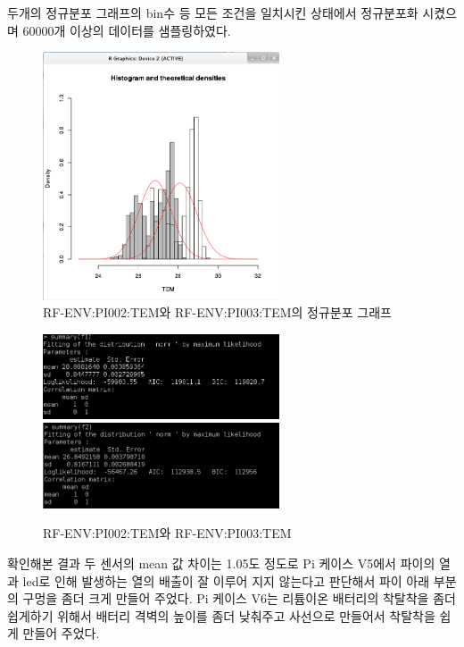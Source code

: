 \documentclass[11pt
  , a4paper
  , article
  , oneside
]{memoir}
\begin{document}
두개의 정규분포 그래프의 bin수 등 모든 조건을 일치시킨 상태에서 정규분포화 시켰으며 60000개 이상의 데이터를 샘플링하였다.

\begin{center}
	\begin{figure}[h]
		\includegraphics[width=7cm]{./images/rtest1.png}
		\caption{RF-ENV:PI002:TEM와 RF-ENV:PI003:TEM의 정규분포 그래프}
	\end{figure}
\end{center}
\begin{center}
	\begin{figure}[h]
		\includegraphics[width=7cm]{./images/16.png}
		\includegraphics[width=7cm]{./images/74.png}
		\caption{RF-ENV:PI002:TEM와 RF-ENV:PI003:TEM}
	\end{figure}
\end{center}
확인해본 결과 두 센서의 mean 값 차이는 1.05도 정도로 Pi 케이스 V5에서 파이의 열과 led로 인해 발생하는 열의 배출이 잘 이루어 지지 않는다고 판단해서 파이 아래 부분의 구멍을 좀더 크게 만들어 주었다.
Pi 케이스 V6는 리튬이온 배터리의 착탈착을 좀더 쉽게하기 위해서 배터리 격벽의 높이를 좀더 낮춰주고 사선으로 만들어서 착탈착을 쉽게 만들어 주었다.
\end{document}
